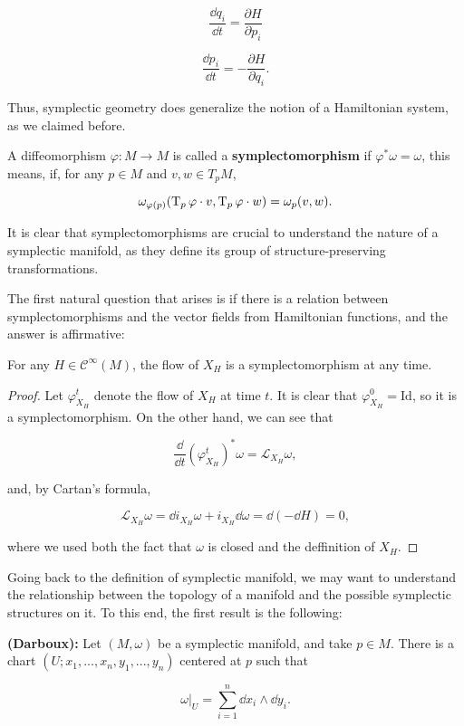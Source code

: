 $$\frac{\dd q_i}{\dd t} = \frac{\partial H}{\partial p_i}$$

$$\frac{\dd p_i}{\dd t} = - \frac{\partial H}{\partial q_i} .$$

Thus, symplectic geometry does generalize the notion of a Hamiltonian system, as we claimed before.

\begin{deff}
A diffeomorphism $\varphi : M \rightarrow M$ is called a {\bf symplectomorphism} if $\varphi^{\ast} \omega = \omega$, this means, if, for any $p \in M$ and $v, w \in T_pM$,

$$\omega_{\varphi(p)}(\operatorname T_p \varphi \cdot v, \operatorname T_p \varphi \cdot w) = \omega_p(v,w) .$$
\end{deff}

It is clear that symplectomorphisms are crucial to understand the nature of a symplectic manifold, as they define its group of structure-preserving transformations.

The first natural question that arises is if there is a relation between symplectomorphisms and the vector fields from Hamiltonian functions, and the answer is affirmative:

\begin{prop}
For any $H \in \mathcal{C}^{\infty}(M)$, the flow of $X_H$ is a symplectomorphism at any time.
\end{prop}

\begin{proof}
Let $\varphi_{X_H}^t$ denote the flow of $X_H$ at time $t$. It is clear that $\varphi_{X_H}^0 = \text{Id}$, so it is a symplectomorphism. On the other hand, we can see that

$$\frac{\dd}{\dd t} (\varphi_{X_H}^t)^{\ast} \omega = \mathcal{L}_{X_H} \omega ,$$

and, by Cartan's formula,

$$\mathcal{L}_{X_H} \omega = \dd i_{X_H} \omega + i_{X_H} \dd \omega = \dd (- \dd H) = 0 ,$$

where we used both the fact that $\omega$ is closed and the deffinition of $X_H$.
\end{proof}

Going back to the definition of symplectic manifold, we may want to understand the relationship between the topology of a manifold and the possible symplectic structures on it. To this end, the first result is the following:

\begin{theo}
{\bf (Darboux):} Let $(M,\omega)$ be a symplectic manifold, and take $p \in M$. There is a chart $(U;x_1,...,x_n,y_1,...,y_n)$ centered at $p$ such that

$$\left. \omega \right|_U = \sum_{i=1}^n \dd x_i \wedge \dd y_i .$$
\end{theo}


